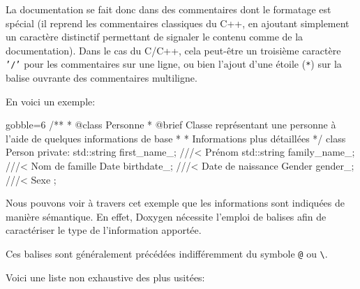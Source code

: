     La documentation se fait donc dans des commentaires dont le formatage est spécial (il reprend les commentaires classiques du C++, en ajoutant simplement un caractère distinctif permettant de signaler le contenu comme de la documentation). Dans le cas du C/C++, cela peut-être un troisième caractère \texttt{'/'} pour les commentaires sur une ligne, ou bien l'ajout d'une étoile (\texttt{*}) sur la balise ouvrante des commentaires multiligne.

    En voici un exemple:
    \begin{cppcode*}{gobble=6}
      /**
       * @class Personne
       * @brief Classe représentant une personne à l'aide de quelques informations de base
       * 
       * Informations plus détaillées
       */
      class Person {
        private:
          std::string first_name_;  ///< Prénom
          std::string family_name_; ///< Nom de famille
          Date        birthdate_;   ///< Date de naissance
          Gender      gender_;      ///< Sexe
      };
    \end{cppcode*}

    Nous pouvons voir à travers cet exemple que les informations sont indiquées de manière sémantique. En effet, Doxygen nécessite l'emploi de balises afin de caractériser le type de l'information apportée.

    \newpage
    Ces balises sont généralement précédées indifféremment du symbole \texttt{@} ou \texttt{\textbackslash}.

    Voici une liste non exhaustive des plus usitées:

